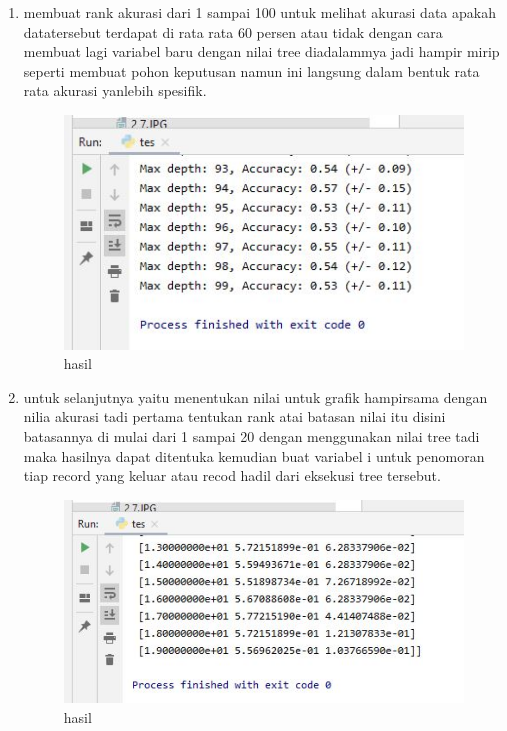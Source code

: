 \begin{enumerate}
\item membuat rank akurasi dari 1 sampai 100 untuk melihat akurasi data apakah datatersebut terdapat di rata rata 60 persen atau tidak dengan cara membuat lagi variabel baru dengan nilai tree diadalammya jadi hampir mirip seperti membuat pohon keputusan namun ini langsung dalam bentuk rata rata akurasi yanlebih spesifik.

\begin{figure}[ht]
\centering
\includegraphics[scale=0.5]{figures/1174042/chapter2/2,10.JPG}
\caption{hasil}
\label{contoh}
\end{figure}

\item untuk selanjutnya yaitu menentukan nilai untuk grafik hampirsama dengan nilia akurasi tadi pertama tentukan rank atai batasan nilai itu disini batasannya di mulai dari 1 sampai 20 dengan menggunakan nilai tree tadi maka hasilnya dapat ditentuka kemudian buat variabel i untuk penomoran tiap record yang keluar atau recod hadil dari eksekusi tree tersebut.

\begin{figure}[ht]
\centering
\includegraphics[scale=0.5]{figures/1174042/chapter2/2,11.JPG}
\caption{hasil}
\label{contoh}
\end{figure}


\end{enumerate}
